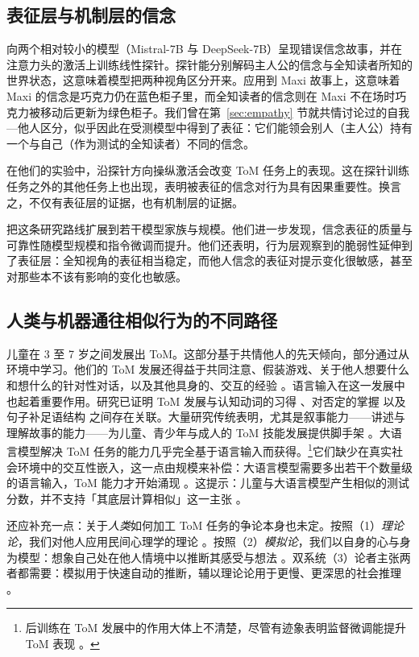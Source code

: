\subsection{表征层与机制层的信念}
\citet{zhu2024language} 向两个相对较小的模型（Mistral-7B 与 DeepSeek-7B）呈现错误信念故事，并在注意力头的激活上训练线性探针。探针能分别解码主人公的信念与全知读者所知的世界状态，这意味着模型把两种视角区分开来。应用到 Maxi 故事上，这意味着 Maxi 的信念是巧克力仍在蓝色柜子里，而全知读者的信念则在 Maxi 不在场时巧克力被移动后更新为绿色柜子。我们曾在第~\ref{sec:empathy} 节就共情讨论过的自我—他人区分，似乎因此在受测模型中得到了表征：它们能领会别人（主人公）持有一个与自己（作为测试的全知读者）不同的信念。

在他们的实验中，沿探针方向操纵激活会改变 ToM 任务上的表现。这在探针训练任务之外的其他任务上也出现，表明被表征的信念对行为具有因果重要性。换言之，不仅有表征层的证据，也有机制层的证据。

\citet{bortoletto2024benchmarking} 把这条研究路线扩展到若干模型家族与规模。他们进一步发现，信念表征的质量与可靠性随模型规模和指令微调而提升。他们还表明，行为层观察到的脆弱性延伸到了表征层：全知视角的表征相当稳定，而他人信念的表征对提示变化很敏感，甚至对那些本不该有影响的变化也敏感。

\subsection{人类与机器通往相似行为的不同路径}
儿童在 3 至 7 岁之间发展出 ToM。这部分基于共情他人的先天倾向，部分通过从环境中学习。他们的 ToM 发展还得益于共同注意、假装游戏、关于他人想要什么和想什么的针对性对话，以及其他具身的、交互的经验 \citep{apperly2011mindreaders}。语言输入在这一发展中也起着重要作用。研究已证明 ToM 发展与认知动词的习得 \citep{milligan2007language}、对否定的掌握 \citep{devilliers2014role} 以及句子补足语结构 \citep{lohmann2003role} 之间存在关联。大量研究传统表明，尤其是叙事能力——讲述与理解故事的能力——为儿童、青少年与成人的 ToM 技能发展提供脚手架 \citep[e.g.]{hutto2008folk, vanduijn2016, nicolopoulou2017narrativity}。大语言模型解决 ToM 任务的能力几乎完全基于语言输入而获得。\footnote{后训练在 ToM 发展中的作用大体上不清楚，尽管有迹象表明监督微调能提升 ToM 表现 \citep{kouwenhoven2026traces}。}它们缺少在真实社会环境中的交互性嵌入，这一点由规模来补偿：大语言模型需要多出若干个数量级的语言输入，ToM 能力才开始涌现 \citep{trott2023do, kouwenhoven2026traces}。这提示：儿童与大语言模型产生相似的测试分数，并不支持「其底层计算相似」这一主张 \citep{hu2025reevaluatingtheorymindevaluation}。

还应补充一点：关于\emph{人类}如何加工 ToM 任务的争论本身也未定。按照（1）\emph{理论论}，我们对他人应用民间心理学的理论 \citep{gopnik1992child}。按照（2）\emph{模拟论}，我们以自身的心与身为模型：想象自己处在他人情境中以推断其感受与想法 \citep{goldman2006simulating}。双系统（3）论者主张两者都需要：模拟用于快速自动的推断，辅以理论论用于更慢、更深思的社会推理 \citep{apperly2009humans}。

